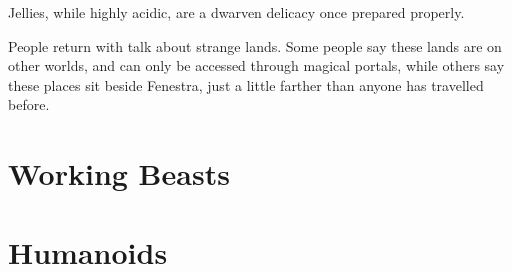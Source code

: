 \begin{multicols}{2}
Jellies, while highly acidic, are a dwarven delicacy once prepared properly.

\jelly

\label{umber_hulk}

People return with talk about strange lands.  Some people say these lands are on other worlds, and can only be accessed through magical portals, while others say these places sit beside Fenestra, just a little farther than anyone has travelled before.

\umberhulk

\end{multicols}

\section{Working Beasts}

\begin{multicols}{2}

\label{horse} 
\horse

\label{hunting_dogs}
\huntingdog

\end{multicols}

\section{Humanoids}

